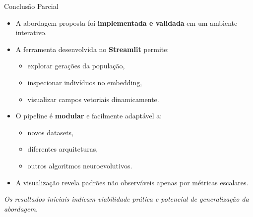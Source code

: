 \documentclass[aspectratio=169]{beamer}
\begin{document}
\begin{frame}{Conclusão Parcial}

\begin{itemize}
  \item A abordagem proposta foi \textbf{implementada e validada} em um ambiente interativo.
  \item A ferramenta desenvolvida no \textbf{Streamlit} permite:
  \begin{itemize}
    \item explorar gerações da população,
    \item inspecionar indivíduos no embedding,
    \item visualizar campos vetoriais dinamicamente.
  \end{itemize}
  \item O pipeline é \textbf{modular} e facilmente adaptável a:
  \begin{itemize}
    \item novos datasets,
    \item diferentes arquiteturas,
    \item outros algoritmos neuroevolutivos.
  \end{itemize}
  \item A visualização revela padrões não observáveis
        apenas por métricas escalares.
\end{itemize}

\vspace{0.15cm}
\centering
\textit{Os resultados iniciais indicam viabilidade prática
e potencial de generalização da abordagem.}

\end{frame}
\end{document}
